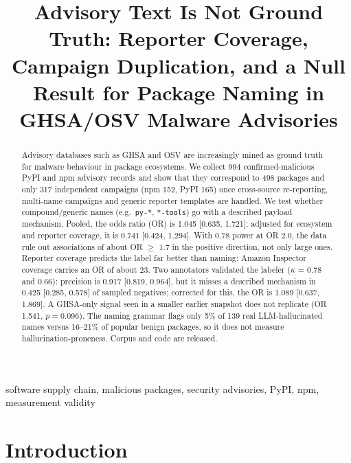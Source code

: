 \documentclass[10pt,conference]{IEEEtran}
\begin{document}
\title{Advisory Text Is Not Ground Truth: Reporter Coverage, Campaign
Duplication, and a Null Result for Package Naming in GHSA/OSV Malware
Advisories}

\author{
}

\maketitle

\begin{abstract}
Advisory databases such as GHSA and OSV are increasingly mined as ground
truth for malware behaviour in package ecosystems. We collect 994
confirmed-malicious PyPI and npm advisory records and show that they
correspond to 498 packages and only 317 independent campaigns (npm 152,
PyPI 165) once cross-source re-reporting, multi-name campaigns and generic
reporter templates are handled. We test whether compound/generic names
(e.g.\ \texttt{py-*}, \texttt{*-tools}) go with a described payload
mechanism. Pooled, the odds ratio (OR) is 1.045 [0.635, 1.721]; adjusted for
ecosystem and reporter coverage, it is 0.741 [0.424, 1.294]. With 0.78 power
at OR 2.0, the data rule out associations of about OR $\geq$ 1.7 in the
positive direction, not only large ones. Reporter coverage predicts the
label far better than naming: Amazon Inspector coverage carries an OR of
about 23. Two annotators validated the labeler ($\kappa$ = 0.78 and 0.66):
precision is 0.917 [0.819, 0.964], but it misses a described mechanism in
0.425 [0.285, 0.578] of sampled negatives; corrected for this, the OR is
1.089 [0.637, 1.869]. A GHSA-only signal seen in a smaller earlier snapshot
does not replicate (OR 1.541, $p=0.096$). The naming grammar flags only 5\% of 139 real
LLM-hallucinated names versus 16--21\% of popular benign packages, so it
does not measure hallucination-proneness. Corpus and code are released.
\end{abstract}

\begin{IEEEkeywords}
software supply chain, malicious packages, security advisories, PyPI, npm,
measurement validity
\end{IEEEkeywords}

\section{Introduction}
\label{sec:intro}
\end{document}
